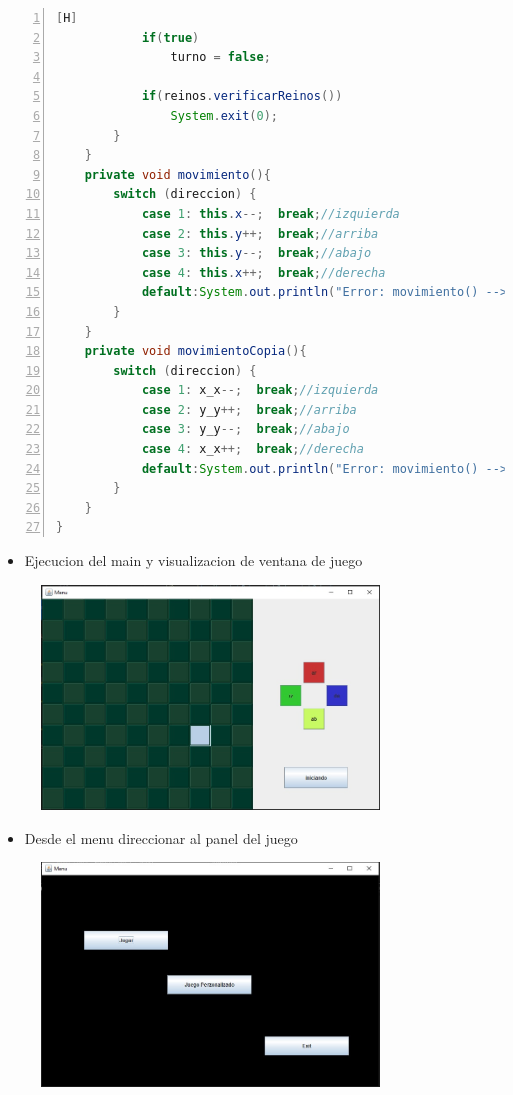 \documentclass{article}
\begin{document}
\begin{lstlisting}[language=Java,caption={Creando la interfaz de tablero},numbers=left,][H]
            if(true)
                turno = false;
                
            if(reinos.verificarReinos())
                System.exit(0);
        }
    }
    private void movimiento(){
        switch (direccion) {
            case 1: this.x--;  break;//izquierda
            case 2: this.y++;  break;//arriba
            case 3: this.y--;  break;//abajo
            case 4: this.x++;  break;//derecha
            default:System.out.println("Error: movimiento() --> Juego");  break;
        }
    }
    private void movimientoCopia(){
        switch (direccion) {
            case 1: x_x--;  break;//izquierda
            case 2: y_y++;  break;//arriba
            case 3: y_y--;  break;//abajo
            case 4: x_x++;  break;//derecha
            default:System.out.println("Error: movimiento() --> Juego-otro");  break;
        }
    }
}
\end{lstlisting}
		\begin{itemize}
			\item Ejecucion del main y visualizacion de ventana de juego
		\end{itemize}	
	
	\begin{figure}[H]
		\centering
		\includegraphics[width=0.8\textwidth,keepaspectratio]{img/ventana_de_juego.jpg}
	\end{figure}

		\begin{itemize}
			\item Desde el menu direccionar al panel del juego
		\end{itemize}
	\begin{figure}[H]
		\centering
		\includegraphics[width=0.8\textwidth,keepaspectratio]{img/ventana_menu.jpg}
	\end{figure}
\end{document}
